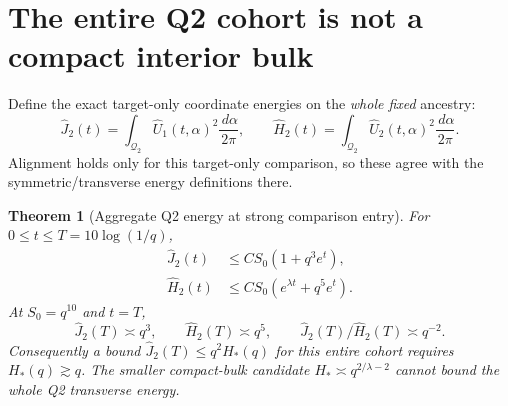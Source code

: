\documentclass[11pt]{article}
\newtheorem{theorem}{Theorem}[section]
\theoremstyle{remark}\newtheorem{remark}[theorem]{Remark}
\newcommand{\dd}{\,d}\newcommand{\E}{\mathbb E}
\newcommand{\Qtwo}{\mathcal Q_2}
\begin{document}
\section{The entire Q2 cohort is not a compact interior bulk}
Define the exact target-only coordinate energies on the \emph{whole fixed} ancestry:
\[
 \widehat J_2(t)=\int_{\Qtwo}\widehat U_1(t,\alpha)^2\frac{\dd\alpha}{2\pi},\qquad
 \widehat H_2(t)=\int_{\Qtwo}\widehat U_2(t,\alpha)^2\frac{\dd\alpha}{2\pi}.
\]
Alignment holds only for this target-only comparison, so these agree with the symmetric/transverse energy definitions there.

\begin{theorem}[Aggregate Q2 energy at strong comparison entry]
\label{inc:AN02:q2completion:v1:energy}
For $0\le t\le T=10\log(1/q)$,
\begin{align}
 \widehat J_2(t)&\le C S_0(1+q^3e^t),\label{inc:AN02:q2completion:v1:Jupper}\\
 \widehat H_2(t)&\le C S_0(e^{\lambda t}+q^5e^t).
 \label{inc:AN02:q2completion:v1:Hupper}
\end{align}
At $S_0=q^{10}$ and $t=T$,
\begin{equation}\label{inc:AN02:q2completion:v1:energylaws}
 \widehat J_2(T)\asymp q^3,\qquad
 \widehat H_2(T)\asymp q^5,\qquad
 \widehat J_2(T)/\widehat H_2(T)\asymp q^{-2}.
\end{equation}
Consequently a bound $\widehat J_2(T)\le q^2H_*(q)$ for this entire cohort requires $H_*(q)\gtrsim q$. The smaller compact-bulk candidate $H_*\asymp q^{2/\lambda-2}$ cannot bound the whole Q2 transverse energy.
\end{theorem}
\end{document}
